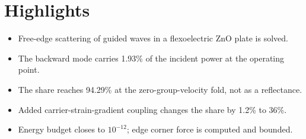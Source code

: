 \documentclass[11pt,a4paper]{article}
\begin{document}
\section*{Highlights}
\begin{itemize}
\item Free-edge scattering of guided waves in a flexoelectric ZnO plate is solved.
\item The backward mode carries 1.93\% of the incident power at the operating point.
\item The share reaches 94.29\% at the zero-group-velocity fold, not as a reflectance.
\item Added carrier-strain-gradient coupling changes the share by 1.2\% to 36\%.
\item Energy budget closes to $10^{-12}$; edge corner force is computed and bounded.
\end{itemize}
\end{document}
